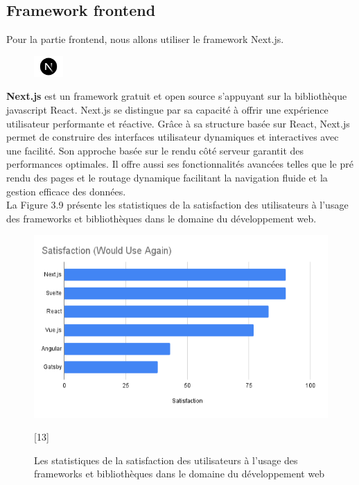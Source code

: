 \subsection{Framework frontend}
\noindent Pour la partie frontend, nous allons utiliser le framework Next.js.
\vspace{0.5em}
\begin{figure}
    \vspace{-15pt}
    \includegraphics[width=0.1\textwidth]{images/chp5/nextjs.png}
\end{figure}
\textbf{Next.js} est un framework gratuit et open source s'appuyant sur la bibliothèque javascript React. Next.js se distingue par sa capacité à offrir une expérience utilisateur performante et réactive. Grâce à sa structure basée sur React, Next.js permet de construire des interfaces utilisateur dynamiques et interactives avec une facilité. Son approche basée sur le rendu côté serveur garantit des performances optimales. Il offre aussi ses fonctionnalités avancées telles que le pré rendu des pages et le routage dynamique facilitant la navigation fluide et la gestion efficace des données.\\
La Figure 3.9 présente les statistiques de la satisfaction des utilisateurs à l’usage des frameworks et bibliothèques dans le domaine du développement web.
    \begin{figure}[H]
        \centering
        \includegraphics[width=1\textwidth,height=0.4\textheight]{images/chp3/fig9.png}
        \caption{Les statistiques de la satisfaction des utilisateurs à l’usage des frameworks et bibliothèques dans le domaine du développement web}[13]        
        \label{fig:Les statistiques de la satisfaction des utilisateurs à l’usage des frameworks et bibliothèques dans le domaine du développement web}    
    \end{figure}

